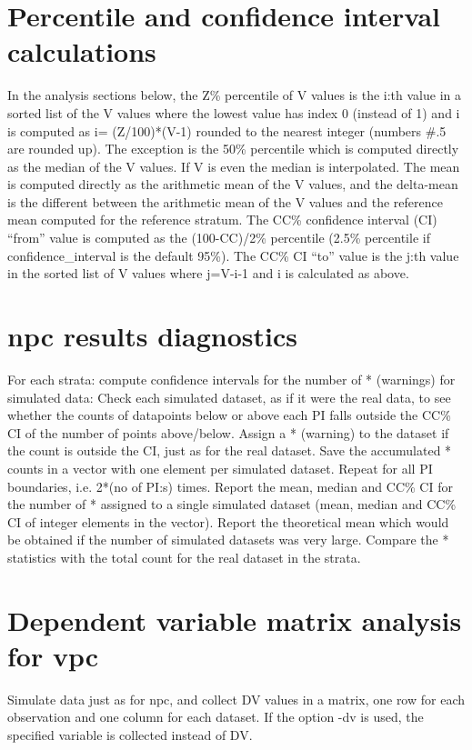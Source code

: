\section{Percentile and confidence interval calculations}
In the analysis sections below, the Z\% percentile of V values is the i:th value in a sorted list of the V values where the lowest value has index 0 (instead of 1) and i is computed as i= (Z/100)*(V-1) rounded to the nearest integer (numbers \#.5 are rounded up). The exception is the 50\% percentile which is computed directly as the median of the V values. If V is even the median is interpolated. The mean is computed directly as the arithmetic mean of the V values, and the delta-mean is the different between the arithmetic mean of the V values and the reference mean computed for the reference stratum.  The CC\% confidence interval (CI) “from” value is computed as the (100-CC)/2\% percentile (2.5\% percentile if confidence\_interval is the default 95\%). The CC\% CI “to” value is the j:th value in the sorted list of V values where j=V-i-1 and i is calculated as above.
\section{npc results diagnostics}
For each strata: compute confidence intervals for the number of * (warnings) for simulated data: Check each simulated dataset, as if it were the real data, to see whether the counts of datapoints below or above each PI falls outside the CC\% CI of the number of points above/below. Assign a * (warning) to the dataset if the count is outside the CI, just as for the real dataset. Save the accumulated * counts in a vector with one element per simulated dataset. Repeat for all PI boundaries, i.e. 2*(no of PI:s) times. Report the mean, median and CC\% CI for the number of * assigned to a single simulated dataset (mean, median and CC\% CI of integer elements in the vector). Report the theoretical mean which would be obtained if the number of simulated datasets was very large. Compare the * statistics with the total count for the real dataset in the strata. 

\section{Dependent variable matrix analysis for vpc}
Simulate data just as for npc, and collect DV values in a matrix, one row for each observation and one column for each dataset. If the option -dv is used, the specified variable is collected instead of DV.

